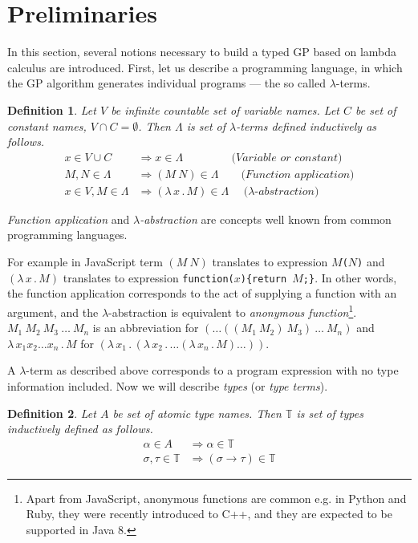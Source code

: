 \documentclass[conference]{IEEEtran}
\newtheorem{definition}{Definition}
\newcommand{\lets}{let us\xspace}
\newcommand{\lterm}{$\lambda$-term\xspace}
\newcommand{\lterms}{$\lambda$-terms\xspace}
\newcommand{\then}{\Rightarrow\xspace}
\newcommand{\lamb}[2]{( \lambda \, #1 \, . \, #2 )}
\newcommand{\lam}[2]{\lambda \, #1 \, . \, #2}
\newcommand{\ar}{\rightarrow\xspace}
\newcommand{\T}{\mathbb{T}\xspace}
\begin{document}
\section{Preliminaries}
\label{preliminaries}

In this section, several notions necessary to build a typed GP based on lambda calculus are introduced. 
First, \lets describe a programming language, 
in which the GP algorithm generates individual programs --- the so called \lterms.


\begin{definition}
Let $V$ be infinite countable set of {\it 
variable names}. Let $C$ be set of {\it constant names}, 
$V \cap C = \emptyset$.	 	
Then $\Lambda$ is set of {\it \lterms} defined inductively as follows.	
\begin{align*}
x   \in V \cup C  &\then x     \in \Lambda 
\textit{~~~~~~~~~~~~~(Variable or constant)}\\
M,N \in \Lambda   &\then (M~N) \in \Lambda 
\textit{~~~~~~(Function application)} \\
x   \in V , M \in \Lambda &\then \lamb{x}{M} \in \Lambda
\textit{~~~~($\lambda$-abstraction)} 
\end{align*}
\end{definition}

\textit{Function application} and 
\textit{$\lambda$-abstraction} are concepts
well known from common programming languages. 

For example in JavaScript term
$(M~N)$ translates to expression \texttt{$M$($N$)} and
$\lamb{x}{M}$ translates to expression \texttt{function($x$)\{return $M$;\}}.
In other words, the function application 
corresponds to the act of supplying a function 
with an argument, and
the $\lambda$-abstraction is equivalent to 
\textit{anonymous function}\footnote{Apart from JavaScript, anonymous functions are common e.g. in Python and Ruby, 
they were recently introduced to C++, and they are expected to be supported in Java 8.}.
$M_1~M_2~M_3~\dots~M_n$ is an abbreviation for $(\dots((M_1~M_2)~M_3)~\dots~M_n)$
and $\lam{x_1 x_2 \dots x_n }{M}$ for $\lamb{x_1}{\lamb{x_2}{\dots\lamb{x_n}{M}\dots}}$.

A \lterm as described above
corresponds to a program expression with no type information
included. Now we will describe \textit{types} (or \textit{type terms}).

\begin{definition}
Let $A$ be set of {\it atomic type names}. 
Then $\mathbb{T}$ is set of {\it types} inductively defined as follows.
\begin{align*}
\alpha      \in A  &\then   \alpha \in \T \\
\sigma,\tau \in \T &\then ( \sigma \ar  \tau ) \in \T 
\end{align*}
\end{definition}
\end{document}
